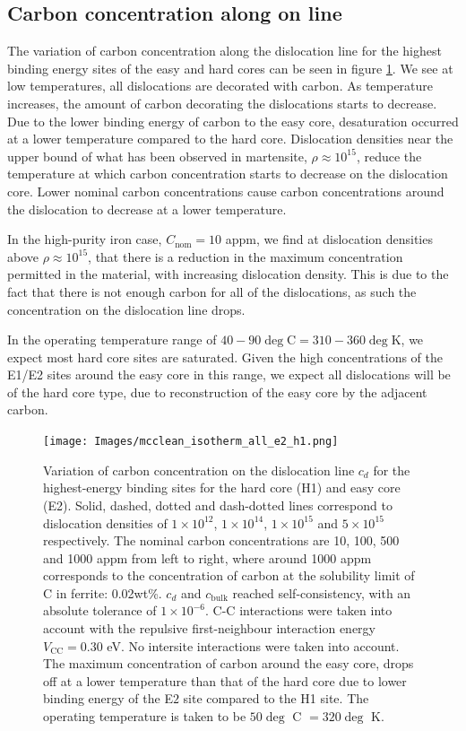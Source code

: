 \documentclass[a4paper,12pt,oneside,print,numbered,index,PageStyleIII]{PhDThesisPSnPDF}
\begin{document}
\subsection{Carbon concentration along on line}
\label{sec:org699e1a2}

The variation of carbon concentration along the dislocation line for the highest
binding energy sites of the easy and hard cores can be seen in figure
\ref{cdhardeasy}. We see at low temperatures, all dislocations are
decorated with carbon. As temperature increases, the amount of carbon
decorating the dislocations starts to decrease. Due to the lower binding
energy of carbon to the easy core, desaturation occurred at a lower
temperature compared to the hard core. Dislocation densities near the upper
bound of what has been observed in martensite, \(\rho \approx10^{15}\), reduce
the temperature at which carbon concentration starts to decrease on the
dislocation core. Lower nominal carbon concentrations cause carbon
concentrations around the dislocation to decrease at a lower temperature.

In the high-purity iron case, \(C_{\text{nom}} = 10\) appm, we find at
dislocation densities above \(\rho \approx10^{15}\), that there is a reduction
in the maximum concentration permitted in the material, with increasing
dislocation density. This is due to the fact that there is not enough carbon
for all of the dislocations, as such the concentration on the dislocation line
drops.

In the operating temperature range of \(40-90\deg\text{C} = 310-360\deg\text{K}\), we expect most hard
core sites are saturated. Given the high concentrations of the E1/E2 sites around the easy core
in this range, we expect all dislocations will be of the hard core type, due to reconstruction of
the easy core by the adjacent carbon.

\begin{landscape}
 \begin{figure}
  \texttt{[image: Images/mcclean\_isotherm\_all\_e2\_h1.png]}
   \caption{Variation of carbon concentration on the dislocation line $c_d$ for the highest-energy binding sites for the hard core (H1) and easy core (E2). Solid, dashed, dotted and dash-dotted lines correspond to dislocation densities of $1\times10^{12}$, $1\times10^{14}$, $1\times10^{15}$ and $5\times10^{15}$ respectively. The nominal carbon concentrations are 10, 100, 500 and 1000 appm from left to right, where around 1000 appm corresponds to the concentration of carbon at the solubility limit of C in ferrite: 0.02wt\%. $c_d$ and $c_{\text{bulk}}$ reached self-consistency, with an absolute tolerance of $1\times 10^{-6}$. C-C interactions were taken into account with the repulsive first-neighbour interaction energy $V_{\text{CC}}=0.30$ eV. No intersite interactions were taken into account. The maximum concentration of carbon around the easy core, drops off at a lower temperature than that of the hard core due to lower binding energy of the E$2$ site compared to the H1 site. The operating temperature is taken to be $50\deg$ C $= 320 \deg$ K.}\label{cdhardeasy}
\end{figure}
\end{landscape}
\end{document}
